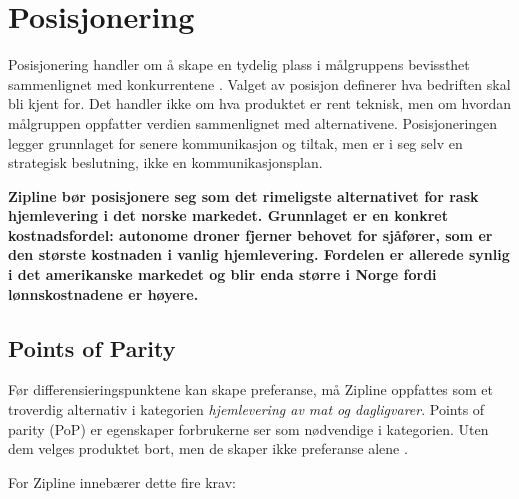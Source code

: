 \documentclass[12pt, a4paper]{article}
\begin{document}

\section{Posisjonering}

Posisjonering handler om å skape en tydelig plass i målgruppens bevissthet
sammenlignet med konkurrentene \parencite[301]{keller2013}. Valget av
posisjon definerer hva bedriften skal bli kjent for. Det handler ikke om hva
produktet er rent teknisk, men om hvordan målgruppen oppfatter verdien
sammenlignet med alternativene. Posisjoneringen legger grunnlaget for senere
kommunikasjon og tiltak, men er i seg selv en strategisk beslutning, ikke en
kommunikasjonsplan.

\textbf{Zipline bør posisjonere seg som det rimeligste alternativet for rask
hjemlevering i det norske markedet. Grunnlaget er en konkret kostnadsfordel:
autonome droner fjerner behovet for sjåfører, som er den største kostnaden i
vanlig hjemlevering. Fordelen er allerede synlig i det amerikanske markedet og
blir enda større i Norge fordi lønnskostnadene er høyere.}

\subsection{Points of Parity}

Før differensieringspunktene kan skape preferanse, må Zipline oppfattes som et
troverdig alternativ i kategorien \textit{hjemlevering av mat og
dagligvarer}. Points of parity (PoP) er egenskaper forbrukerne ser som
nødvendige i kategorien. Uten dem velges produktet bort, men de skaper ikke
preferanse alene \parencite[302]{keller2013}.

For Zipline innebærer dette fire krav:
\end{document}
